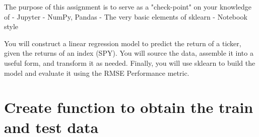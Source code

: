 \documentclass[11pt]{article}
\begin{document}
The purpose of this assignment is to serve as a "check-point" on your
knowledge of - Jupyter - NumPy, Pandas - The very basic elements of
sklearn - Notebook style

You will construct a linear regression model to predict the return of a
ticker, given the returns of an index (SPY). You will source the data,
assemble it into a useful form, and transform it as needed. Finally, you
will use sklearn to build the model and evaluate it using the RMSE
Performance metric.

    \section{\texorpdfstring{{Create function to obtain the train and test
data}}{Create function to obtain the train and test data}}\label{create-function-to-obtain-the-train-and-test-data}
\end{document}
